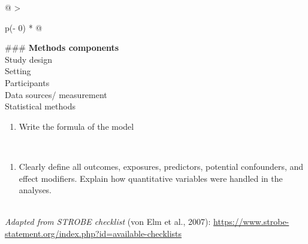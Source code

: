 \documentclass[
  openany]{book}
\providecommand{\tightlist}{%
  \setlength{\itemsep}{0pt}\setlength{\parskip}{0pt}}
\begin{document}
\begin{longtable}[]{@{}
  >{\raggedright\arraybackslash}p{(\columnwidth - 0\tabcolsep) * }@{}}
\toprule
\#\#\# \textbf{Methods components} \\
\midrule
\endhead
Study design \\
Setting \\
Participants \\
Data sources/ measurement \\
Statistical methods \\
\begin{minipage}[t]{\linewidth}\raggedright
\begin{enumerate}
\def\labelenumi{(\alph{enumi})}
\setcounter{enumi}{1}
\tightlist
\item
  Write the formula of the model
\end{enumerate}
\end{minipage} \\
\begin{minipage}[t]{\linewidth}\raggedright
\begin{enumerate}
\def\labelenumi{(\alph{enumi})}
\setcounter{enumi}{2}
\tightlist
\item
  Clearly define all outcomes, exposures, predictors, potential confounders, and effect modifiers. Explain how quantitative variables were handled in the analyses.
\end{enumerate}
\end{minipage} \\
\emph{Adapted from STROBE checklist} (von Elm et al., 2007): \url{https://www.strobe-statement.org/index.php?id=available-checklists} \\
\bottomrule
\end{longtable}
\end{document}
